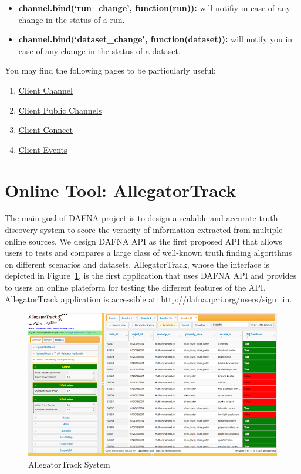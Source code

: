 \documentclass[a4paper,10pt]{scrartcl}
\begin{document}
\begin{itemize}
 \item \textbf{channel.bind(`run\_change', function(run){}):} will notifiy in case of any change in the status of a run.
 \item \textbf{channel.bind(`dataset\_change', function(dataset){}):} will notify you in case of any change in the status of a dataset. 
\end{itemize}
You may find the following pages to be particularly useful:
\begin{enumerate}
 \item \href{https://pusher.com/docs/client_api_guide/client_channels}{Client Channel}
 \item \href{https://pusher.com/docs/client_api_guide/client_public_channels}{Client Public Channels}
 \item \href{https://pusher.com/docs/client_api_guide/client_connect}{Client Connect}
 \item \href{https://pusher.com/docs/client_api_guide/client_events}{Client Events}
\end{enumerate}

\section{Online Tool: AllegatorTrack}
The main goal of DAFNA project is to design a scalable and accurate truth discovery system to score the veracity of information extracted from multiple 
online sources.  We design DAFNA API as the first proposed API that allows users to tests and compares a large class of well-known truth finding algorithms
on different scenarios and datasets. AllegatorTrack, whose the interface is depicted in Figure~\ref{allegatortrack}, is the first application that uses DAFNA API and provides to users
an online plateform for testing the different features of the API. AllegatorTrack application is accessible at: \href{http://dafna.qcri.org/users/sign\_in}{\small{http://dafna.qcri.org/users/sign\_in}}.

\begin{figure}[!ht]
\centering
\includegraphics[scale=0.45]{snapshot} 
\caption{AllegatorTrack System}\label{allegatortrack}
\end{figure}
\end{document}
